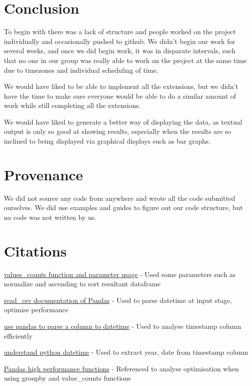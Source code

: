 \documentclass[12pt,a4paper,final]{article}
\begin{document}
\section*{Conclusion}

To begin with there was a lack of structure and people worked on the project individually and occasionally pushed to github. We didn't begin our work for several weeks, and once we did begin work, it was in disparate intervals, such that no one in our group was really able to work on the project at the same time due to timezones and individual scheduling of time.

We would have liked to be able to implement all the extensions, but we didn't have the time to make sure everyone would be able to do a similar amount of work while still completing all the extensions.

We would have liked to generate a better way of displaying the data, as textual output is only so good at showing results, especially when the results are so inclined to being displayed via graphical displays such as bar graphs.

\section*{Provenance}

We did not source any code from anywhere and wrote all the code submitted ourselves. We did use examples and guides to figure out our code structure, but no code was not written by us.

\section*{Citations}

\noindent
\href{https://www.w3resource.com/pandas/series/series-value_counts.php}{values\_counts function and parameter usage}
\newline - Used some parameters such as normalize and ascending to sort resultant dataframe

\noindent
\href{https://pandas.pydata.org/pandas-docs/stable/reference/api/pandas.read_csv.html}{read\_csv documentation of Pandas}
\newline - Used to parse datetime at input stage, optimise performance

\noindent
\href{https://pandas.pydata.org/pandas-docs/stable/reference/api/pandas.to_datetime.html}{use pandas to parse a column to datetime}
\newline - Used to analyse timestamp column efficiently

\noindent
\href{https://docs.python.org/3/library/datetime.html} {understand python datetime}
\newline - Used to extract year, date from timestamp column

\noindent
\href{https://books.google.co.uk/books?id=LcHgDwAAQBAJ&pg=PT337&lpg=PT337&dq=pandas+value_counts+performance&source=bl&ots=bgNWdiwkVC&sig=ACfU3U0bGo5e7tdN6bztLRuGNm3EC1vI6Q&hl=en&sa=X&ved=2ahUKEwjzpMjT9JzpAhXDTxUIHXdJDBgQ6AEwBnoECAoQAQ#v=onepage&q=pandas%20value_counts%20performance&f=false} {Pandas high performance functions}
\newline - Referenced to analyse optimisation when using groupby and value\_counts functions
\end{document}
